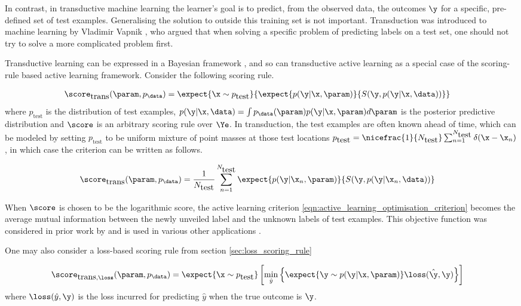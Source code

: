 In contrast, in transductive machine learning the learner's goal is to predict, from the observed data, the outcomes $\y$ for a specific, pre-defined set of test examples. Generalising the solution to outside this training set is not important. Transduction was introduced to machine learning by Vladimir Vapnik \citep[see \eg][]{gammerman1998learning}, who argued that when solving a specific problem of predicting labels on a test set, one should not try to solve a more complicated problem first.

Transductive learning can be expressed in a Bayesian framework \citep{Graepel1999}, and so can transductive active learning as a special case of the scoring-rule based active learning framework. Consider the following scoring rule.

\begin{align}
	\score_{\mbox{trans}}(\param,p_\data) &= \expect{\x\sim p_{\mbox{test}}}{\expect{p(\y\vert\x,\param)}{S(\y,p(\y\vert\x,\data))}}
\end{align}
where $p_{\mbox{test}}$ is the distribution of test examples, $p(\y\vert\x,\data)=\int p_{\data}(\param) p(\y\vert\x,\param) d\param $ is the posterior predictive distribution and $\score$ is an arbitrary scoring rule over $\Ye$. In transduction, the test examples are often known ahead of time, which can be modeled by setting $p_{\mbox{test}}$ to be uniform mixture of point masses at those test locations $p_{\mbox{test}} = \nicefrac{1}{N_{\mbox{test}}}\sum_{n=1}^{N_{\mbox{test}}} \delta(\x - \x_n)$, in which case the criterion can be written as follows.

\begin{align}
	\score_{\mbox{trans}}(\param,p_\data) &= \frac{1}{N_{\mbox{test}}}\sum_{n=1}^{N_{\mbox{test}}} \expect{p(\y\vert\x_n,\param)}{S(\y,p(\y\vert\x_n,\data))}
\end{align}

When $\score$ is chosen to be the logarithmic score, the active learning criterion \eqref{eqn:active_learning_optimisation_criterion} becomes the average mutual information between the newly unveiled label and the unknown labels of test examples. This objective function was considered in prior work by \citet{MacKay1992} and is used in various other applications \citep[see \eg][]{Ertin2003,Fuhrmann2003}.

One may also consider a loss-based scoring rule from section \ref{sec:loss_scoring_rule}

\begin{align}
	\score_{\mbox{trans},\loss}(\param,p_\data) &= \expect{\x\sim p_{\mbox{test}}}\left[ \min_{\hat{y}} \left\{\expect{\y\sim p(\y\vert\x,\param)} \loss(\hat{\y},\y) \right\} \right]\label{eqn:transductive_loss_scoring}
\end{align}
where $\loss(\hat{y},\y)$ is the loss incurred for predicting $\hat{y}$ when the true outcome is $\y$.

